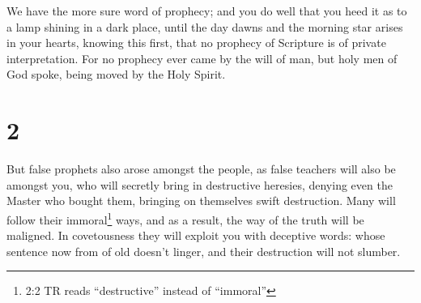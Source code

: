  We have the more sure word of prophecy; and you do well
that you heed it as to a lamp shining in a dark place, until the day
dawns and the morning star arises in your hearts,  knowing
this first, that no prophecy of Scripture is of private interpretation.
 For no prophecy ever came by the will of man, but holy men
of God spoke, being moved by the Holy Spirit.

\hypertarget{section-1}{%
\section{2}\label{section-1}}

 But false prophets also arose amongst the people, as false
teachers will also be amongst you, who will secretly bring in
destructive heresies, denying even the Master who bought them, bringing
on themselves swift destruction.  Many will follow their
immoral\footnote{2:2 TR reads ``destructive'' instead of ``immoral''}
ways, and as a result, the way of the truth will be maligned.
 In covetousness they will exploit you with deceptive words:
whose sentence now from of old doesn't linger, and their destruction
will not slumber.

